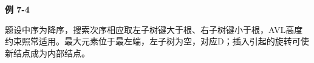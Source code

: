 {\color{ink}\bfseries 例 7-4}\par\vspace{1bp}题设中序为降序，搜索次序相应取左子树键大于根、右子树键小于根，AVL高度约束照常适用。最大元素位于最左端，左子树为空，对应D；插入引起的旋转可使新结点成为内部结点。

